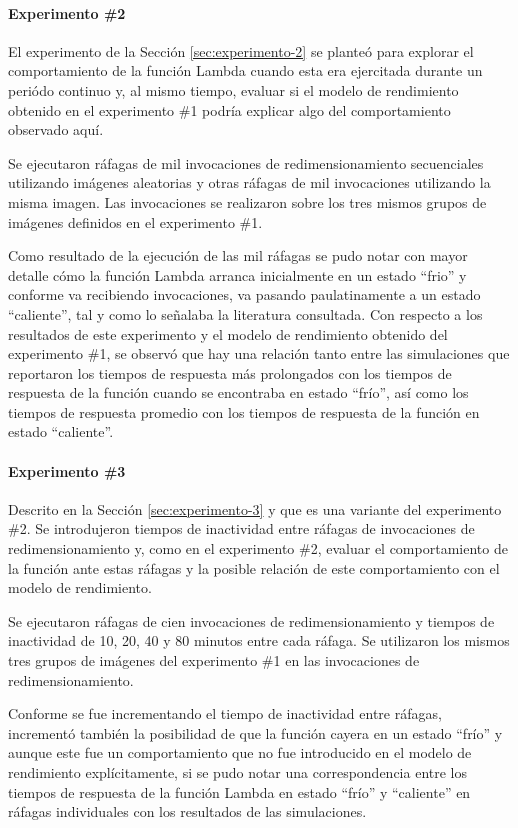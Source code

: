 \paragraph{Experimento \#2} El experimento de la Sección \ref{sec:experimento-2} se planteó para explorar el comportamiento de la función Lambda cuando esta era ejercitada durante un periódo continuo y, al mismo tiempo, evaluar si el modelo de rendimiento obtenido en el experimento \#1 podría explicar algo del comportamiento observado aquí.

Se ejecutaron ráfagas de mil invocaciones de redimensionamiento secuenciales utilizando imágenes aleatorias y otras ráfagas de mil invocaciones utilizando la misma imagen. Las invocaciones se realizaron sobre los tres mismos grupos de imágenes definidos en el experimento \#1.

Como resultado de la ejecución de las mil ráfagas se pudo notar con mayor detalle cómo la función Lambda arranca inicialmente en un estado ``frio'' y conforme va recibiendo invocaciones, va pasando paulatinamente a un estado ``caliente'', tal y como lo señalaba la literatura consultada. Con respecto a los resultados de este experimento y el modelo de rendimiento obtenido del experimento \#1, se observó que hay una relación tanto entre las simulaciones que reportaron los tiempos de respuesta más prolongados con los tiempos de respuesta de la función cuando se encontraba en estado ``frío'', así como los tiempos de respuesta promedio con los tiempos de respuesta de la función en estado ``caliente''.

\paragraph{Experimento \#3} Descrito en la Sección \ref{sec:experimento-3} y que es una variante del experimento \#2. Se introdujeron tiempos de inactividad entre ráfagas de invocaciones de redimensionamiento y, como en el experimento \#2, evaluar el comportamiento de la función ante estas ráfagas y la posible relación de este comportamiento con el modelo de rendimiento.

Se ejecutaron ráfagas de cien invocaciones de redimensionamiento y tiempos de inactividad de 10, 20, 40 y 80 minutos entre cada ráfaga. Se utilizaron los mismos tres grupos de imágenes del experimento \#1 en las invocaciones de redimensionamiento.

Conforme se fue incrementando el tiempo de inactividad entre ráfagas, incrementó también la posibilidad de que la función cayera en un estado ``frío'' y aunque este fue un comportamiento que no fue introducido en el modelo de rendimiento explícitamente, si se pudo notar una correspondencia entre los tiempos de respuesta de la función Lambda en estado ``frío'' y ``caliente'' en ráfagas individuales con los resultados de las simulaciones.

